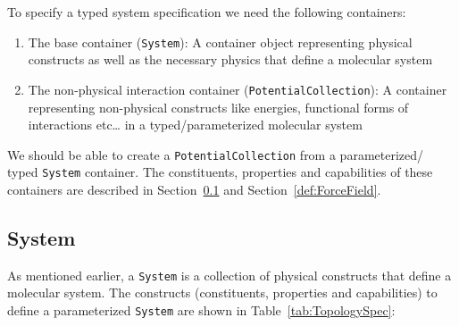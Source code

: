 \documentclass[12pt]{article}
\begin{document}
\noindent To specify a typed system specification we need the following containers:

\begin{enumerate}
    \item The base container (\texttt{System}): A container object representing physical constructs as well as the necessary physics that define a molecular system

    \item The non-physical interaction container (\texttt{PotentialCollection}): A container representing non-physical constructs like energies, functional forms of interactions etc… in a typed/parameterized molecular system
\end{enumerate}

We should be able to create a \texttt{PotentialCollection} from a parameterized/ typed \texttt{System} container. The constituents, properties and capabilities of these containers are described in Section~\ref{def:Topology} and Section~\ref{def:ForceField}.

\subsection{System}
\label{def:Topology}
As mentioned earlier, a \texttt{System} is a collection of physical constructs that define a molecular system. The constructs (constituents, properties and capabilities) to define a parameterized \texttt{System} are shown in  Table~\ref{tab:TopologySpec}:
\end{document}
